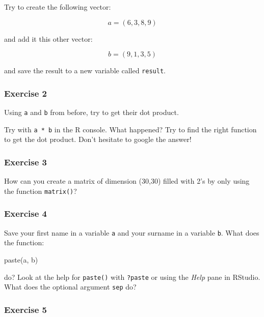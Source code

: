 \documentclass[
]{article}
\newenvironment{Shaded}{\begin{snugshade}}{\end{snugshade}}
\newcommand{\FunctionTok}[1]{\textcolor[rgb]{0.00,0.00,0.00}{#1}}
\newcommand{\NormalTok}[1]{#1}
\begin{document}
Try to create the following vector:

\[a = (6,3,8,9)\]

and add it this other vector:

\[b = (9,1,3,5)\]

and save the result to a new variable called \texttt{result}.

\hypertarget{exercise-2}{%
\subsubsection*{Exercise 2}\label{exercise-2}}

Using \texttt{a} and \texttt{b} from before, try to get their dot product.

Try with \texttt{a\ *\ b} in the R console. What happened?
Try to find the right function to get the dot product. Don't hesitate to google the answer!

\hypertarget{exercise-3}{%
\subsubsection*{Exercise 3}\label{exercise-3}}

How can you create a matrix of dimension (30,30) filled with 2's by only using the function \texttt{matrix()}?

\hypertarget{exercise-4}{%
\subsubsection*{Exercise 4}\label{exercise-4}}

Save your first name in a variable \texttt{a} and your surname in a variable \texttt{b}. What does the function:

\begin{Shaded}
\begin{Highlighting}[]
\FunctionTok{paste}\NormalTok{(a, b)}
\end{Highlighting}
\end{Shaded}

do? Look at the help for \texttt{paste()} with \texttt{?paste} or using the \emph{Help} pane in RStudio. What does the
optional argument \texttt{sep} do?

\hypertarget{exercise-5}{%
\subsubsection*{Exercise 5}\label{exercise-5}}
\end{document}
